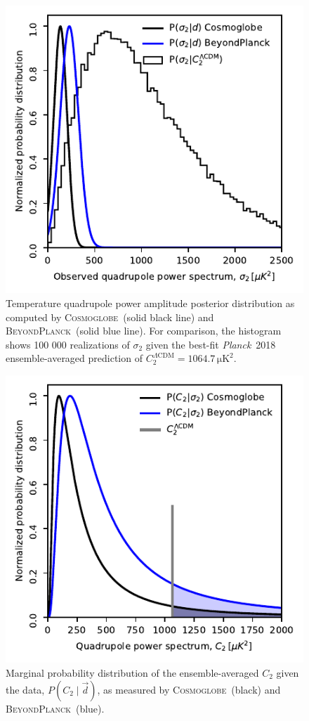 \documentclass[twocolumn]{../../common/aa}
\def\Planck{\emph{Planck}}
\newcommand{\BP}{\textsc{BeyondPlanck}}
\newcommand{\bp}{\textsc{BeyondPlanck}}
\newcommand{\cosmoglobe}{\textsc{Cosmoglobe}}
\newcommand{\Cosmoglobe}{\textsc{Cosmoglobe}}
\newcommand{\data}{\vec d}
\begin{document}
\begin{figure}[t]
	\includegraphics[width=\columnwidth]{figures/WMAP_P_sig_d_c.pdf}
	\caption{Temperature quadrupole power amplitude posterior distribution as computed by \cosmoglobe\ (solid black line) and \bp\ (solid blue line). For comparison, the histogram shows 100 000 realizations of $\sigma_2$ given the best-fit \Planck\ 2018 ensemble-averaged prediction of ${C_2^{\Lambda \mathrm{CDM}} = 1064.7\,\mathrm{\mu K^2}}$.}
	\label{fig:sigma_2_hist}
\end{figure}

\begin{figure}[t]
	\includegraphics[width=\columnwidth]{figures/WMAP_blackwell-rao.pdf}
	\caption{Marginal probability distribution of the ensemble-averaged $C_2$ given the data, $P(C_2\mid\data)$, as measured by \Cosmoglobe\ (black) and \BP\ (blue).}
	\label{fig:blackwell_rao_sigma_2}
\end{figure}
\end{document}
